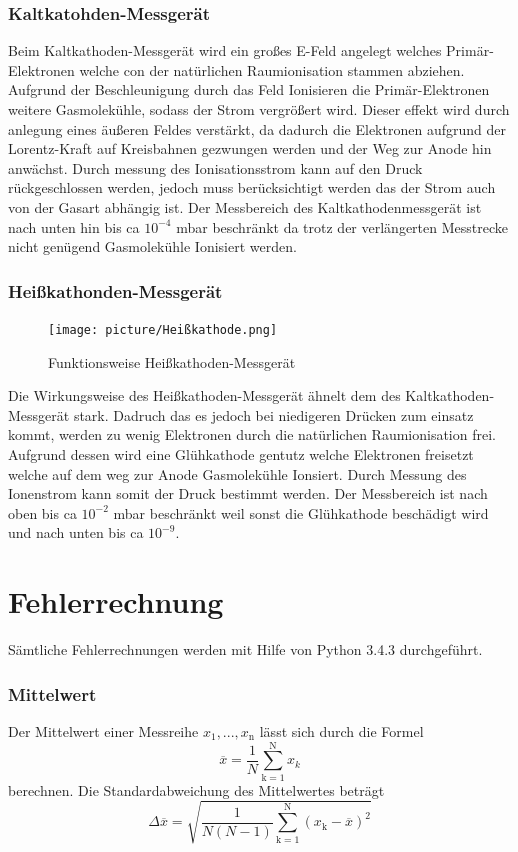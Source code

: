 \subsubsection{Kaltkatohden-Messgerät}
Beim Kaltkathoden-Messgerät wird ein großes E-Feld angelegt welches Primär-Elektronen welche con der natürlichen Raumionisation stammen abziehen. Aufgrund der Beschleunigung durch das Feld Ionisieren die Primär-Elektronen weitere Gasmolekühle, sodass der Strom vergrößert wird. Dieser effekt wird durch anlegung eines äußeren Feldes verstärkt, da dadurch die Elektronen aufgrund der Lorentz-Kraft auf Kreisbahnen gezwungen werden und der Weg zur Anode hin anwächst. Durch messung des Ionisationsstrom kann auf den Druck rückgeschlossen werden, jedoch muss berücksichtigt werden das der Strom auch von der Gasart abhängig ist. Der Messbereich des Kaltkathodenmessgerät ist nach unten hin bis ca $10^{-4}$ mbar beschränkt da trotz der verlängerten Messtrecke nicht genügend Gasmolekühle Ionisiert werden.

\subsubsection{Heißkathonden-Messgerät}
\begin{figure}
  \vspace{-1.0cm}
  \centering
  \texttt{[image: picture/Heißkathode.png]}
  \caption{Funktionsweise Heißkathoden-Messgerät \cite{Heiss}}
  \label{fig:Heißkathode}
  \vspace{-1cm}
\end{figure}
Die Wirkungsweise des Heißkathoden-Messgerät ähnelt dem des Kaltkathoden-Messgerät stark. Dadruch das es jedoch bei niedigeren Drücken zum einsatz kommt, werden zu wenig Elektronen durch die natürlichen Raumionisation frei. Aufgrund dessen wird eine Glühkathode gentutz welche Elektronen freisetzt welche auf dem weg zur Anode Gasmolekühle Ionsiert. Durch Messung des Ionenstrom kann somit der Druck bestimmt werden. Der Messbereich ist nach oben bis ca $10^{-2}$ mbar beschränkt weil sonst die Glühkathode beschädigt wird und nach unten bis ca $10^{-9}$.  
\section{Fehlerrechnung}
Sämtliche Fehlerrechnungen werden mit Hilfe von Python 3.4.3 durchgeführt.
\subsubsection{Mittelwert}
Der Mittelwert einer Messreihe $x_\text{1}, ... ,x_\text{n}$ lässt sich durch die Formel
\begin{equation}
	\overline{x} = \frac{1}{N} \sum_{\text{k}=1}^\text{N} x_k
	\label{eqn:ave}
\end{equation}
berechnen. Die Standardabweichung des Mittelwertes beträgt
\begin{equation}
	\Delta \overline{x} = \sqrt{ \frac{1}{N(N-1)} \sum_{\text{k}=1}^\text{N} (x_\text{k} - \overline{x})^2}
	\label{eqn:std}
\end{equation}

